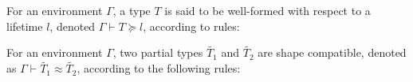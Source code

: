 \begin{subappendices}
\begin{definition}
\end{definition}
\begin{definition} For an environment $\Gamma$, a type $T$ is said to be well-formed with respect to a lifetime $l$, denoted $\Gamma \vdash T \succeq l$, according to rules:
\end{definition}
\vspace{-2.0em}
\begin{mathpar}


\end{mathpar}
\begin{definition} For an environment $\Gamma$, two partial types $\widetilde{T_1}$ and $\widetilde{T_2}$ are shape compatible, denoted as $\Gamma \vdash \widetilde{T_1} \approx \widetilde{T_2}$, according to the following rules:
\end{definition}
\vspace{-2.0em}
\begin{mathpar}





\end{mathpar}
\end{subappendices}
